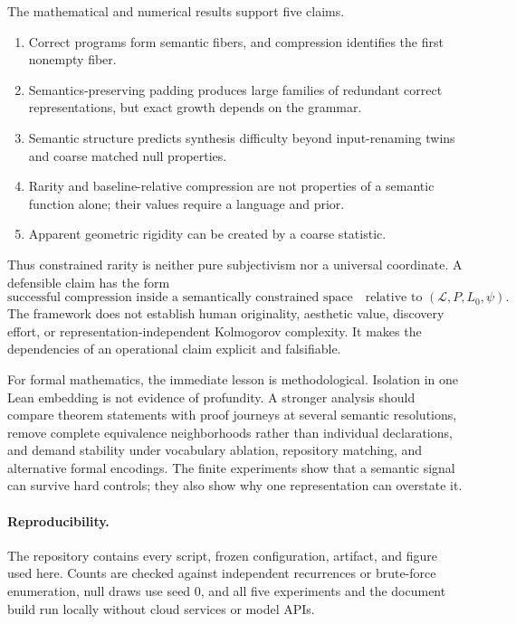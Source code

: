 \documentclass[10pt]{article}
\theoremstyle{definition}
\begin{document}
The mathematical and numerical results support five claims.
\begin{enumerate}
  \setlength{\itemsep}{0pt}
  \setlength{\parskip}{0pt}
  \setlength{\parsep}{0pt}
  \item Correct programs form semantic fibers, and compression identifies the
  first nonempty fiber.
  \item Semantics-preserving padding produces large families of redundant
  correct representations, but exact growth depends on the grammar.
  \item Semantic structure predicts synthesis difficulty beyond input-renaming
  twins and coarse matched null properties.
  \item Rarity and baseline-relative compression are not properties of a
  semantic function alone; their values require a language and prior.
  \item Apparent geometric rigidity can be created by a coarse statistic.
\end{enumerate}

Thus constrained rarity is neither pure subjectivism nor a universal
coordinate.  A defensible claim has the form
\[
 \text{successful compression inside a semantically constrained space}
 \quad\text{relative to }(\mathcal L,P,L_0,\psi).
 \tag{18}
\]
The framework does not establish human originality, aesthetic value, discovery
effort, or representation-independent Kolmogorov complexity.  It makes the
dependencies of an operational claim explicit and falsifiable.

For formal mathematics, the immediate lesson is methodological.  Isolation in
one Lean embedding is not evidence of profundity.  A stronger analysis should
compare theorem statements with proof journeys at several semantic
resolutions, remove complete equivalence neighborhoods rather than individual
declarations, and demand stability under vocabulary ablation, repository
matching, and alternative formal encodings.  The finite experiments show that
a semantic signal can survive hard controls; they also show why one
representation can overstate it.

\paragraph{Reproducibility.}
The repository contains every script, frozen configuration, artifact, and
figure used here.  Counts are checked against independent recurrences or
brute-force enumeration, null draws use seed 0, and all five experiments and
the document build run locally without cloud services or model APIs.
\end{document}
